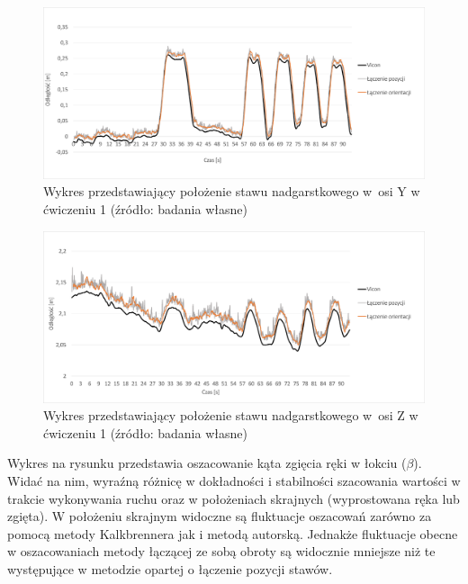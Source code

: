								
\begin{savenotes}
	\begin{figure}[!htb]
		\centering
		\includegraphics[width=\textwidth]{images/100/Slide5.png}
		\caption{Wykres przedstawiający położenie stawu nadgarstkowego w~osi Y w ćwiczeniu 1 (źródło: badania własne)}
		\label{fig:experiments:first:wristY}
	\end{figure}
\end{savenotes}
										
\begin{savenotes}
	\begin{figure}[!htb]
		\centering
		\includegraphics[width=\textwidth]{images/100/Slide6.png}
		\caption{Wykres przedstawiający położenie stawu nadgarstkowego w~osi Z w ćwiczeniu 1 (źródło: badania własne)}
		\label{fig:experiments:first:wristZ}
	\end{figure}
\end{savenotes}
			
Wykres na rysunku \label{fig:experiments:first:angle} przedstawia oszacowanie kąta zgięcia ręki w łokciu ($\beta$). Widać na nim, wyraźną różnicę w dokładności i stabilności szacowania wartości w trakcie wykonywania ruchu oraz w położeniach skrajnych (wyprostowana ręka lub zgięta). W położeniu skrajnym widoczne są fluktuacje oszacowań zarówno za pomocą metody Kalkbrennera jak i metodą autorską. Jednakże fluktuacje obecne w oszacowaniach metody łączącej ze sobą obroty są widocznie mniejsze niż te występujące w metodzie opartej o łączenie pozycji stawów.
			
